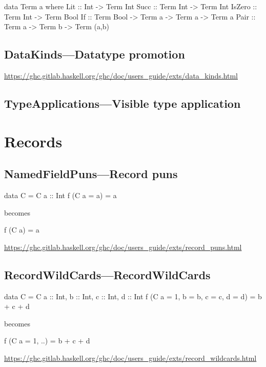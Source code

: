 \documentclass[openany, 12pt]{book}
\begin{document}
\begin{haskell}{}
data Term a where
    Lit    :: Int -> Term Int
    Succ   :: Term Int -> Term Int
    IsZero :: Term Int -> Term Bool
    If     :: Term Bool -> Term a -> Term a -> Term a
    Pair   :: Term a -> Term b -> Term (a,b)
\end{haskell}

\setcounter{chapter}{10}
\chapter{DataKinds---Datatype promotion}
\url{https://ghc.gitlab.haskell.org/ghc/doc/users_guide/exts/data_kinds.html}

\setcounter{chapter}{16}
\chapter{TypeApplications---Visible type application}

\part{Records}

\setcounter{chapter}{6}
\chapter{NamedFieldPuns---Record puns}
\begin{haskell}{}
data C = C {a :: Int}
f (C {a = a}) = a
\end{haskell}
becomes

\begin{haskell}{}
f (C {a}) = a
\end{haskell}

\url{https://ghc.gitlab.haskell.org/ghc/doc/users_guide/exts/record_puns.html}

\chapter{RecordWildCards---RecordWildCards}
\begin{haskell}{}
data C = C {a :: Int, b :: Int, c :: Int, d :: Int}
f (C {a = 1, b = b, c = c, d = d}) = b + c + d
\end{haskell}
becomes

\begin{haskell}{}
f (C {a = 1, ..}) = b + c + d
\end{haskell}
\url{https://ghc.gitlab.haskell.org/ghc/doc/users_guide/exts/record_wildcards.html}
\end{document}
